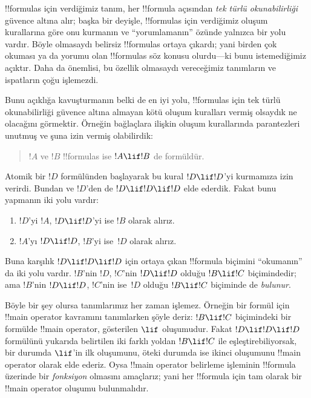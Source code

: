 \documentclass[../../../include/open-logic-section]{subfiles}
\begin{document}


\begin{explain}
!!{formula}s için verdiğimiz tanım, her !!{formula} açısından \emph{tek türlü
okunabilirliği} güvence altına alır; başka bir deyişle, !!{formula}s için
verdiğimiz oluşum kurallarına göre onu kurmanın ve ``yorumlamanın'' özünde
yalnızca bir yolu vardır. Böyle olmasaydı belirsiz !!{formula}s ortaya
çıkardı; yani birden çok okuması ya da yorumu olan !!{formula}s söz konusu olurdu---ki
bunu istemediğimiz açıktır. Daha da önemlisi, bu özellik olmasaydı
vereceğimiz tanımların ve ispatların çoğu işlemezdi.

Bunu açıklığa kavuşturmanın belki de en iyi yolu, !!{formula}s için tek
türlü okunabilirliği güvence altına almayan kötü oluşum kuralları
vermiş olsaydık ne olacağını görmektir. Örneğin bağlaçlara ilişkin
oluşum kurallarında parantezleri unutmuş ve şuna izin vermiş
olabilirdik:
\begin{quote}
$!A$ ve $!B$ !!{formula}s ise $!A \lif !B$ de formüldür.
\end{quote}
Atomik bir $!D$ formülünden başlayarak bu kural $!D \lif !D$'yi
kurmamıza izin verirdi. Bundan ve $!D$'den de $!D \lif !D \lif !D$
elde ederdik. Fakat bunu yapmanın iki yolu vardır:
\begin{enumerate}
\item $!D$'yi $!A$, $!D \lif !D$'yi ise $!B$ olarak alırız.
\item $!A$'yı $!D \lif !D$, $!B$'yi ise~$!D$ olarak alırız.
\end{enumerate}
Buna karşılık $!D \lif !D \lif !D$ için ortaya çıkan !!{formula}
biçimini ``okumanın'' da iki yolu vardır. $!B$'nin $!D$, $!C$'nin $!D \lif !D$ olduğu $!B \lif !C$
biçimindedir; ama $!B$'nin $!D \lif !D$, $!C$'nin ise~$!D$ olduğu $!B
\lif !C$ biçiminde de \emph{bulunur}.

Böyle bir şey olursa tanımlarımız her zaman işlemez. Örneğin bir
formül için !!{main operator} kavramını tanımlarken şöyle deriz: $!B \lif !C$
biçimindeki bir formülde !!{main operator}, gösterilen $\lif$
oluşumudur. Fakat $!D \lif !D \lif !D$ formülünü yukarıda belirtilen iki
farklı yoldan $!B \lif !C$ ile eşleştirebiliyorsak, bir durumda
$\lif$'in ilk oluşumunu, öteki durumda ise ikinci oluşumunu !!{main
operator} olarak elde ederiz. Oysa !!{main operator} belirleme işleminin
!!{formula} üzerinde bir \emph{fonksiyon} olmasını amaçlarız; yani her !!{formula} için tam
olarak bir !!{main
  operator} oluşumu bulunmalıdır.
\end{explain}
\end{document}
